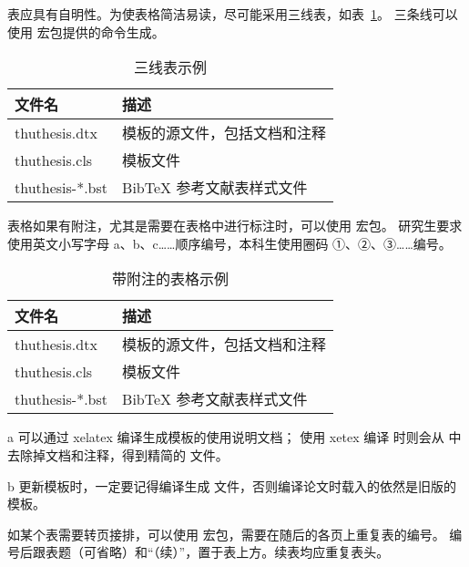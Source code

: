 表应具有自明性。为使表格简洁易读，尽可能采用三线表，如表~\ref{tab:three-line}。
三条线可以使用  宏包提供的命令生成。

\begin{table}
  \centering
  \caption{三线表示例}
  \begin{tabular}{ll}
    \toprule
    文件名          & 描述                         \\
    \midrule
    thuthesis.dtx   & 模板的源文件，包括文档和注释 \\
    thuthesis.cls   & 模板文件                     \\
    thuthesis-*.bst & BibTeX 参考文献表样式文件    \\
    \bottomrule
  \end{tabular}
  \label{tab:three-line}
\end{table}

表格如果有附注，尤其是需要在表格中进行标注时，可以使用  宏包。
研究生要求使用英文小写字母 a、b、c……顺序编号，本科生使用圈码 ①、②、③……编号。

\begin{table}
  \centering
  \begin{threeparttable}[c]
    \caption{带附注的表格示例}
    \label{tab:three-part-table}
    \begin{tabular}{ll}
      \toprule
      文件名                 & 描述                         \\
      \midrule
      thuthesis.dtx\tnote{a} & 模板的源文件，包括文档和注释 \\
      thuthesis.cls\tnote{b} & 模板文件                     \\
      thuthesis-*.bst        & BibTeX 参考文献表样式文件    \\
      \bottomrule
    \end{tabular}
    \begin{tablenotes}
      \item [a] 可以通过 xelatex 编译生成模板的使用说明文档；
        使用 xetex 编译  时则会从  中去除掉文档和注释，得到精简的  文件。
      \item [b] 更新模板时，一定要记得编译生成  文件，否则编译论文时载入的依然是旧版的模板。
    \end{tablenotes}
  \end{threeparttable}
\end{table}

如某个表需要转页接排，可以使用  宏包，需要在随后的各页上重复表的编号。
编号后跟表题（可省略）和“（续）”，置于表上方。续表均应重复表头。

